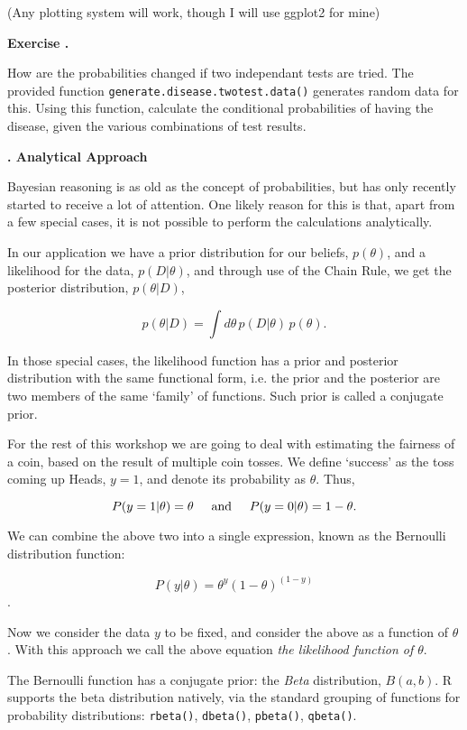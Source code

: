 \documentclass[10pt, a4paper]{article}
\newcounter{wssection}
\newcounter{wsexercise}[wssection]
\newcommand{\worksheetsection}[1]{
\vspace{10mm}
\stepcounter{wssection}
\noindent \Large \textbf{\thewssection. #1} \normalsize
\vspace{3mm}
}
\newcommand{\worksheetexercise}{
\stepcounter{wsexercise}
\vspace{5mm} \noindent \textbf{Exercise \thewssection.\thewsexercise \;}
}
\begin{document}
(Any plotting system will work, though I will use ggplot2 for mine)


\worksheetexercise
How are the probabilities changed if two independant tests are
tried. The provided function \texttt{generate.disease.twotest.data()}
generates random data for this. Using this function, calculate the
conditional probabilities of having the disease, given the various
combinations of test results.



\worksheetsection{Analytical Approach}

\noindent
Bayesian reasoning is as old as the concept of probabilities, but has
only recently started to receive a lot of attention. One likely reason
for this is that, apart from a few special cases, it is not possible
to perform the calculations analytically.

In our application we have a prior distribution for our beliefs,
$p(\theta)$, and a likelihood for the data, $p(D | \theta)$, and
through use of the Chain Rule, we get the posterior distribution,
$p(\theta | D)$,

\[ p(\theta | D) = \int d\theta \, p(D | \theta) \, p(\theta).  \]

In those special cases, the likelihood function has a prior and
posterior distribution with the same functional form, i.e. the prior
and the posterior are two members of the same `family' of functions.
Such prior is called a conjugate prior.

For the rest of this workshop we are going to deal with estimating the
fairness of a coin, based on the result of multiple coin tosses. We
define `success' as the toss coming up Heads, $y=1$, and denote its
probability as $\theta$. Thus,

\[ P(y = 1 | \theta) = \theta \hspace{5mm} \text{and} \hspace{5mm}
   P(y = 0 | \theta) = 1 - \theta. \]

\noindent
We can combine the above two into a single expression, known as the Bernoulli distribution function:

\[ P(y | \theta) = \theta^y (1 - \theta)^{(1 - y)} \].

Now we consider the data $y$ to be fixed, and consider the above as a
function of $\theta$. With this approach we call the above equation
\emph{the likelihood function of $\theta$}.

The Bernoulli function has a conjugate prior: the \emph{Beta}
distribution, $B(a, b)$. R supports the beta distribution natively,
via the standard grouping of functions for probability distributions:
\texttt{rbeta()}, \texttt{dbeta()}, \texttt{pbeta()}, \texttt{qbeta()}.
\end{document}
